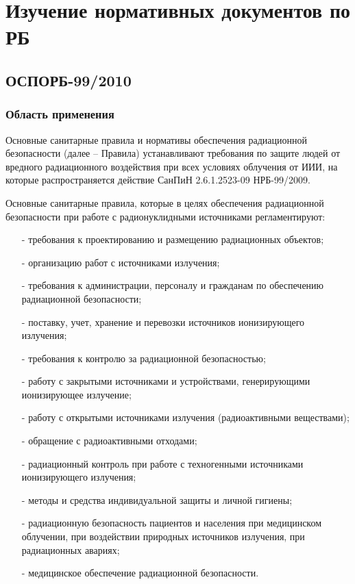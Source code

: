 \chapter{Изучение нормативных документов по РБ} \label{chap1}
\section{ОСПОРБ-99/2010} \label{sect1_1}
\subsection{Область применения} \label{subsect1_1_1}
    Основные санитарные правила и нормативы обеспечения радиационной 
    безопасности (далее -- Правила) устанавливают требования по защите 
    людей от вредного радиационного воздействия при всех условиях 
    облучения от ИИИ, на которые распространяется действие СанПиН 
    2.6.1.2523-09 НРБ-99/2009.

    Основные санитарные правила, которые в целях обеспечения радиационной 
    безопасности при работе с радионуклидными источниками регламентируют:
    \begin{itemize}
    	\item[-] требования к проектированию и размещению радиационных 
    		объектов;
		\item[-] организацию работ с источниками излучения;
		\item[-] требования к администрации, персоналу и гражданам по 
			обеспечению радиационной безопасности;
		\item[-] поставку, учет, хранение и перевозки источников 
			ионизирующего излучения;
		\item[-] требования к контролю за радиационной безопасностью;
		\item[-] работу с закрытыми источниками и устройствами, генерирующими 
			ионизирующее излучение;
		\item[-] работу с открытыми источниками излучения (радиоактивными 
			веществами);
		\item[-] обращение с радиоактивными отходами;
		\item[-] радиационный контроль при работе с техногенными источниками 
			ионизирующего излучения;
		\item[-] методы и средства индивидуальной защиты и личной гигиены;
		\item[-] радиационную безопасность пациентов и населения при 
			медицинском облучении, при воздействии природных источников 
			излучения, при радиационных авариях;
		\item[-] медицинское обеспечение радиационной безопасности.
    \end{itemize}

